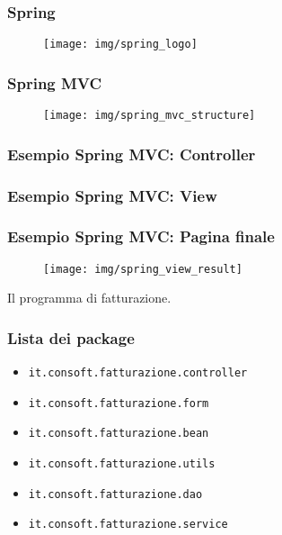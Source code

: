 \documentclass[]{beamer}
\begin{document}
    \begin{frame}
        \frametitle{Spring}
        \begin{figure}[H]
            \centering
            \texttt{[image: img/spring\_logo]}\label{spring:logo}
        \end{figure}
    \end{frame}

    \begin{frame}
        \frametitle{Spring MVC}
        \begin{figure}[H]
            \centering
            \texttt{[image: img/spring\_mvc\_structure]}\label{spring:diagram}
        \end{figure}
    \end{frame}

    \begin{frame}
       \frametitle{Esempio Spring MVC\@: Controller}
       
    \end{frame}

    \begin{frame}
       \frametitle{Esempio Spring MVC\@: View}
       
    \end{frame}

    \begin{frame}
       \frametitle{Esempio Spring MVC\@: Pagina finale}
       \begin{figure}[H]
           \centering
           \texttt{[image: img/spring\_view\_result]}\label{spring:final_view}
       \end{figure}
    \end{frame}

    \begin{frame}
        \begin{center}
            \Huge Il programma di fatturazione.
        \end{center}
    \end{frame}

    \begin{frame}
        \frametitle{Lista dei package}
        \begin{itemize}
        \item \texttt{it.consoft.fatturazione.controller}
        \item \texttt{it.consoft.fatturazione.form}    
        \item \texttt{it.consoft.fatturazione.bean}
        \item \texttt{it.consoft.fatturazione.utils}
        \item \texttt{it.consoft.fatturazione.dao}
        \item \texttt{it.consoft.fatturazione.service}
        \end{itemize}
    \end{frame}
\end{document}
